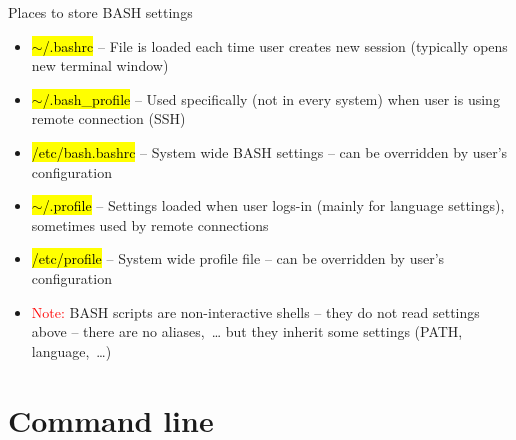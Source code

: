 \documentclass[compress, ucs, xelatex, 11pt, xcolor=svgnames,
  hyperref={
    bookmarks=true,
    unicode=true,
    colorlinks=true,
    pdftitle={Linux, command line and MetaCentrum},
    plainpages=false,
    pdfauthor={Vojtech Zeisek},
    pdfsubject={Course about use of Linux command line, writing shell scripts and using MetaCentrum of CESNET},
    pdfcreator={XeLaTeX},
    pdfkeywords={Linux, GNU, BASH, shell, command line, MetaCentrum},
    linkcolor=DarkRed,
    anchorcolor=DarkBlue,
    citecolor=Indigo,
    filecolor=NavyBlue,
    menucolor=DarkMagenta,
    urlcolor=DarkBlue,
    pdftex},
  url={hyphens, lowtilde} %
  ]{beamer}
\renewcommand{\texttt}[1]{\hl{\ttfamily #1}}
\renewcommand{\alert}[1]{\textcolor{red}{#1}}
\begin{document}
\begin{frame}{Places to store BASH settings}
  \begin{itemize}
    \item \texttt{$\sim$/.bashrc} -- File is loaded each time user creates new session (typically opens new terminal window)
    \item \texttt{$\sim$/.bash\_profile} -- Used specifically (not in every system) when user is using remote connection (SSH)
    \item \texttt{/etc/bash.bashrc} -- System wide BASH settings -- can be overridden by user's configuration
    \item \texttt{$\sim$/.profile} -- Settings loaded when user logs-in (mainly for language settings), sometimes used by remote connections
    \item \texttt{/etc/profile} -- System wide profile file -- can be overridden by user's configuration
    \item \alert{Note:} BASH scripts are non-interactive shells -- they do not read settings above -- there are no aliases,~\ldots{ }but they inherit some settings (PATH, language,~\ldots)
  \end{itemize}
\end{frame}

\section{Command line}
\end{document}
